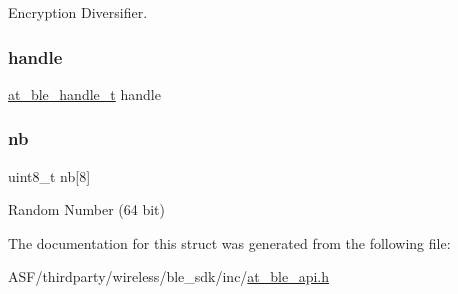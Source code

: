 Encryption Diversifier. 

\mbox{\label{structat__ble__encryption__request__t_ab8b0f353cb6a8d85f0822900e3b7cf35}} 
\subsubsection{\texorpdfstring{handle}{handle}}
{\footnotesize\ttfamily \mbox{\hyperlink{at__ble__api_8h_abd23646d0c662860741f787efc8456f2}{at\+\_\+ble\+\_\+handle\+\_\+t}} handle}

\mbox{\label{structat__ble__encryption__request__t_a3199b838db07457933ad33b42b04de39}} 
\subsubsection{\texorpdfstring{nb}{nb}}
{\footnotesize\ttfamily uint8\+\_\+t nb\mbox{[}8\mbox{]}}



Random Number (64 bit) 



The documentation for this struct was generated from the following file\+:\begin{DoxyCompactItemize}
\item 
A\+S\+F/thirdparty/wireless/ble\+\_\+sdk/inc/\mbox{\hyperlink{at__ble__api_8h}{at\+\_\+ble\+\_\+api.\+h}}\end{DoxyCompactItemize}
